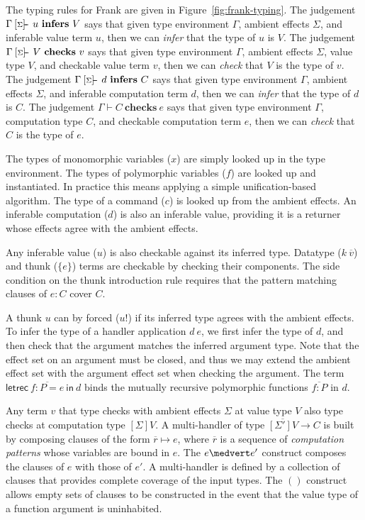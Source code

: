 \documentclass[preprint]{sigplanconf}
\newcommand{\many}{\overline}
\newcommand{\judgeword}[1]{~\mathbf{#1}~}
\newcommand{\sigentails}[1]{\mathbin{[{\text{\scriptsize ${#1}$}}]\!\text{-\!-}}\,}
\newcommand{\makes}[4]  {#1 \sigentails{#2} {#3} \judgeword{infers} {#4}}
\newcommand{\has}[4] {#1 \sigentails{#2} {#3} \judgeword{checks} {#4}}
\newcommand{\can}[4]{#1 \sigentails{#2} {#3} \judgeword{infers} {#4}}
\newcommand{\does}[3]{#1 \vdash {#2} \judgeword{checks} {#3}}
\newcommand{\makesgs}{\makes{\Gamma}{\sigs}}
\newcommand{\hasgs}{\has{\Gamma}{\sigs}}
\newcommand{\cangs}{\can{\Gamma}{\sigs}}
\newcommand{\doesg}{\does{\Gamma}}
\newcommand{\sigs}{\Sigma}
\newcommand{\effbox}[1]{[#1]}
\newcommand{\key}[1]{\mathsf{#1}}
\newcommand{\thunk}[1]{\{{#1}\}}
\begin{document}
The typing rules for Frank are given in Figure~\ref{fig:frank-typing}.
%
The judgement $\makesgs{u}{V}$ says that given type environment
$\Gamma$, ambient effects $\sigs$, and inferable value term $u$, then
we can \emph{infer} that the type of $u$ is $V$.
%
The judgement $\hasgs{V}{v}$ says that given type environment
$\Gamma$, ambient effects $\sigs$, value type $V$, and checkable value
term $v$, then we can \emph{check} that $V$ is the type of $v$.
%
The judgement $\cangs{d}{C}$ says that given type environment
$\Gamma$, ambient effects $\sigs$, and inferable computation term $d$,
then we can \emph{infer} that the type of $d$ is $C$.
%
The judgement $\doesg{C}{e}$ says that given type environment
$\Gamma$, computation type $C$, and checkable computation term $e$,
then we can \emph{check} that $C$ is the type of $e$.

The types of monomorphic variables ($x$) are simply looked up in the
type environment. The types of polymorphic variables ($f$) are looked
up and instantiated. In practice this means applying a simple
unification-based algorithm.
%
The type of a command ($c$) is looked up from the ambient effects.
%
An inferable computation ($d$) is also an inferable value, providing
it is a returner whose effects agree with the ambient effects.

Any inferable value ($u$) is also checkable against its inferred
type. Datatype ($k~\many{v}$) and thunk ($\thunk{e}$) terms are
checkable by checking their components. The side condition on the
thunk introduction rule requires that the pattern matching clauses of
$e : C$ cover $C$.

A thunk $u$ can by forced ($u!$) if its inferred type agrees with the
ambient effects. To infer the type of a handler application $d~e$, we
first infer the type of $d$, and then check that the argument matches
the inferred argument type. Note that the effect set on an argument
must be closed, and thus we may extend the ambient effect set with the
argument effect set when checking the argument.
%
%
The term $\key{letrec}~\many{f : P = e}~\key{in}~d$ binds the mutually
recursive polymorphic functions $\many{f:P}$ in $d$.

Any term $v$ that type checks with ambient effects $\sigs$ at value
type $V$ also type checks at computation type $\effbox{\sigs}V$.
%
A multi-handler of type $\many{\effbox{\sigs'}V} \to C$ is built by
composing clauses of the form $\many{r} \mapsto e$, where $\many{r}$
is a sequence of \emph{computation patterns} whose variables are bound
in $e$.
%
The $e \medvert e'$ construct composes the clauses of $e$ with those
of $e'$. A multi-handler is defined by a collection of clauses that
provides complete coverage of the input types.
%
The $()$ construct allows empty sets of clauses to be constructed in
the event that the value type of a function argument is uninhabited.
\end{document}
